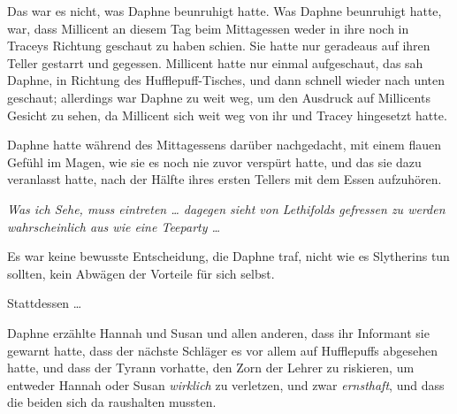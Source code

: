 Das war es nicht, was Daphne beunruhigt hatte. Was Daphne beunruhigt hatte, war, dass Millicent an diesem Tag beim Mittagessen weder in ihre noch in Traceys Richtung geschaut zu haben schien. Sie hatte nur geradeaus auf ihren Teller gestarrt und gegessen. Millicent hatte nur einmal aufgeschaut, das sah Daphne, in Richtung des Hufflepuff-Tisches, und dann schnell wieder nach unten geschaut; allerdings war Daphne zu weit weg, um den Ausdruck auf Millicents Gesicht zu sehen, da Millicent sich weit weg von ihr und Tracey hingesetzt hatte.

Daphne hatte während des Mittagessens darüber nachgedacht, mit einem flauen Gefühl im Magen, wie sie es noch nie zuvor verspürt hatte, und das sie dazu veranlasst hatte, nach der Hälfte ihres ersten Tellers mit dem Essen aufzuhören.

\emph{Was ich Sehe, muss eintreten … dagegen sieht von Lethifolds gefressen zu werden wahrscheinlich aus wie eine Teeparty …}

Es war keine bewusste Entscheidung, die Daphne traf, nicht wie es Slytherins tun sollten, kein Abwägen der Vorteile für sich selbst.

Stattdessen …

Daphne erzählte Hannah und Susan und allen anderen, dass ihr Informant sie gewarnt hatte, dass der nächste Schläger es vor allem auf Hufflepuffs abgesehen hatte, und dass der Tyrann vorhatte, den Zorn der Lehrer zu riskieren, um entweder Hannah oder Susan \emph{wirklich} zu verletzen, und zwar \emph{ernsthaft}, und dass die beiden sich da raushalten mussten.


